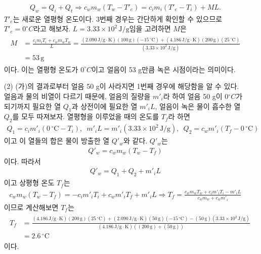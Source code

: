 \documentclass[floatfix,nofootinbib,superscriptaddress,fleqn]{revtex4-2}
\begin{document}
\begin{itemize}
\begin{align}
  Q_w = Q_i + Q_t
  \Longrightarrow c_{w}m_{w}(T_w-T'_e) = c_{i}m_{i}(T'_e-T_i)+ML.
\end{align}
$T'_e$는 새로운 열평형 온도이다.
3번째 경우는 간단하게 확인할 수 있으므로 $T'_e=0 ^\circ C$라고 해보자.
$L=3.33\times10^2\,\mathrm{J/g}$임을 고려하면 $M$은
\begin{align}
  \begin{split}
    M &= \frac{c_i m_i T_i+c_w m_w T_w}{L}
    = \frac{(2.090\,\mathrm{J/g\cdot K}) (100\,\mathrm{g}) (-15\,\mathrm{^\circ C})
    +(4.186\,\mathrm{J/g\cdot K}) (200\,\mathrm{g}) (25\,\mathrm{^\circ C})}
    {(3.33\times10^2\,\mathrm{J/g})}  \\
    &=53\,\mathrm{g}
  \end{split}
\end{align}
이다. 이는 열평형 온도가 $0 ^\circ C$이고 얼음이 53 g만큼 녹은 시점이라는 의미이다.

  \item[(2)] 
  (가)의 결과로부터 얼음 50 g이 사라지면 1번째 경우에 해당함을 알 수 있다. 얼음과
  물의 비열이 다르기 때문에, 얼음의 질량을 $m'_i$라 하여
  얼음 50 g이 0$^\circ C$가 되기까지 필요한 열 $Q_1$과 
  상전이에 필요한 열 $m'_iL$, 얼음이 녹은 물이 흡수한 열 $Q_2$를 모두 따져보자.
  열평형을 이루었을 때의 온도를 $T_f$라 하면
  \begin{align}
    Q_1 = c_i m'_i (0\,\mathrm{^\circ C} - T_i),\,\,\,
    m'_i L = m'_i(3.33\times10^2\,\mathrm{J/g}),\,\,\,
    Q_2 = c_w m'_i (T_f - 0\,\mathrm{^\circ C})
  \end{align} 
  이고 이 열들의 합은 물이 방출한 열 $Q'_w$와 같다. $Q'_w$는
  \begin{align}
    Q'_w = c_w m_w (T_w - T_f)
  \end{align}
  이다. 따라서
  \begin{align}
    Q'_w = Q_1+Q_2+m'_i L
  \end{align}
  이고 상평형 온도 $T_f$는
  \begin{align}
    c_w m_w (T_w - T_f) = -c_i m'_i T_i +c_w m'_i T_f + m'_i L
    \Longrightarrow
    T_f = \frac{c_w m_w T_w+c_i m'_i T_i-m'_i L}{c_w m_w+c_w m'_i}
  \end{align}
  이므로 계산해보면 $T_f$는
  \begin{align}
    \begin{split}
      T_f &= \frac{(4.186\,\mathrm{J/g\cdot K}) (200\,\mathrm{g}) 
      (25\,\mathrm{^\circ C})+(2.090\,\mathrm{J/g\cdot K}) (50\,\mathrm{g}) 
      (-15\,\mathrm{^\circ C})-(50\,\mathrm{g}) 
      (3.33\times10^2\,\mathrm{J/g})}
      {(4.186\,\mathrm{J/g\cdot K}) ((200\,\mathrm{g})+ (50\,\mathrm{g}))}  \\
      &= 2.6\,\mathrm{^\circ C}
    \end{split}
  \end{align}
  이다.
\end{itemize}
\end{document}
